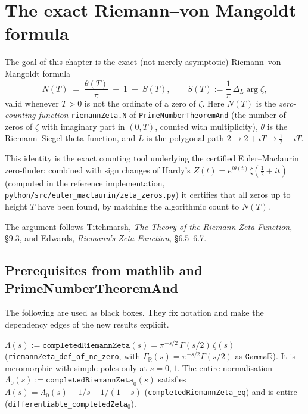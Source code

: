 %
%

\chapter{The exact Riemann--von Mangoldt formula}
\label{cha:n_formula}

The goal of this chapter is the exact (not merely asymptotic) Riemann--von Mangoldt
formula
\[
  N(T) \;=\; \frac{\theta(T)}{\pi} \;+\; 1 \;+\; S(T),
  \qquad
  S(T) := \frac{1}{\pi}\,\Delta_{L}\arg\zeta ,
\]
valid whenever $T>0$ is not the ordinate of a zero of $\zeta$. Here $N(T)$ is the
\emph{zero-counting function} \texttt{riemannZeta.N} of
\texttt{PrimeNumberTheoremAnd} (the number of zeros of $\zeta$ with imaginary part
in $(0,T)$, counted with multiplicity), $\theta$ is the Riemann--Siegel theta
function, and $L$ is the polygonal path $2 \to 2+iT \to \tfrac12+iT$.

This identity is the exact counting tool underlying the certified
Euler--Maclaurin zero-finder: combined with sign changes of Hardy's
$Z(t) = e^{i\theta(t)}\zeta(\tfrac12+it)$ (computed in the reference implementation,
\texttt{python/src/euler\_maclaurin/zeta\_zeros.py}) it certifies that all zeros up to height
$T$ have been found, by matching the algorithmic count to $N(T)$.

The argument follows Titchmarsh, \emph{The Theory of the Riemann Zeta-Function},
\S 9.3, and Edwards, \emph{Riemann's Zeta Function}, \S 6.5--6.7.

\section{Prerequisites from mathlib and PrimeNumberTheoremAnd}
\label{sec:nf_prereqs}

The following are used as black boxes. They fix notation and make the dependency
edges of the new results explicit.

\begin{definition}
\label{def:nf_completedZeta}
\leanok
$\Lambda(s) := \texttt{completedRiemannZeta}(s) = \pi^{-s/2}\,\Gamma(s/2)\,\zeta(s)$
(\texttt{riemannZeta\_def\_of\_ne\_zero}, with $\Gamma_{\mathbb R}(s)=\pi^{-s/2}\Gamma(s/2)$
as $\texttt{Gamma}\mathbb{R}$). It is meromorphic with simple poles only at $s=0,1$.
The entire normalisation $\Lambda_0(s) := \texttt{completedRiemannZeta}_0(s)$ satisfies
$\Lambda(s) = \Lambda_0(s) - 1/s - 1/(1-s)$ (\texttt{completedRiemannZeta\_eq}) and is
entire (\texttt{differentiable\_completedZeta}$_0$).
\end{definition}

